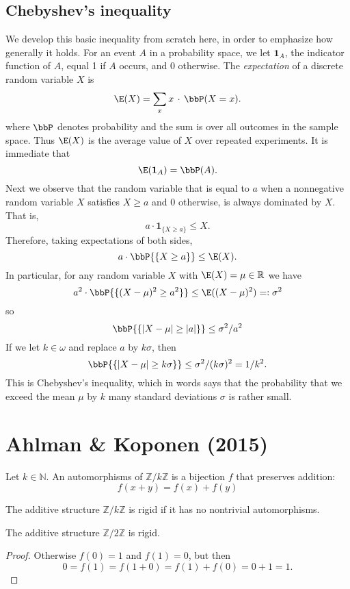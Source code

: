 \section{Chebyshev's inequality}

We develop this basic inequality from scratch here, in order to emphasize how generally it holds. For an event $A$ in a probability space, we let $\mathbf 1_A$, the indicator function of $A$, equal 1 if $A$ occurs, and $0$ otherwise. The \emph{expectation} of a discrete random variable $X$ is 
\[
\E(X)=\sum_x x\,\cdot\,\bbP(X=x).
\]
where $\bbP$ denotes probability and the sum is over all outcomes in the sample space. Thus $\E(X)$ is the average value of $X$ over repeated experiments. It is immediate that
\[
\E (\mathbf 1_{A}) = \bbP(A).
\]
Next we observe that the random variable that is equal to $a$ when a nonnegative random variable $X$ satisfies $X\ge a$ and $0$ otherwise, is always dominated by $X$. That is, 
\[
a\cdot \mathbf 1_{\{X\ge a\}} \le X.
\]
Therefore, taking expectations of both sides,
\[
a\cdot \bbP{\{X\ge a\}} \le \E(X).
\]
In particular, for any random variable $X$ with $\E(X)=\mu\in\mathbb R$ we have 
\[
a^2\cdot \bbP{\{(X-\mu)^2\ge a^2\}} \le \E ((X-\mu)^2)=:\sigma^2
\]
so
\[
\bbP{\{|X-\mu|\ge |a|\}} \le \sigma^2/a^2
\]
If we let $k\in\omega$ and replace $a$ by $k\sigma$, then
\[
\bbP{\{|X-\mu|\ge k\sigma\}} \le \sigma^2/(k\sigma)^2 = 1/k^2.
\]
This is Chebyshev's inequality, which in words says that the probability that we exceed the mean $\mu$ by $k$ many standard deviations $\sigma$ is rather small.

\chapter{Ahlman \& Koponen (2015)}
\begin{definition}
	\label{def:auto}
	\leanok
	Let $k\in\mathbb N$.
	An automorphisms of $\mathbb Z/ k\mathbb Z$ is a bijection $f$ that preserves addition:
	\[
	f(x+y)=f(x)+f(y)
	\]
\end{definition}
\begin{definition}
	\label{def:rigid}
	\leanok
	The additive structure $\mathbb Z/ k\mathbb Z$ is rigid if it has no nontrivial automorphisms.
\end{definition}


\begin{theorem}
	\label{thm:rigid}
	\leanok
	The additive structure $\mathbb Z/ 2\mathbb Z$ is rigid.
\end{theorem}
\begin{proof}
	Otherwise $f(0)=1$ and $f(1)=0$, but then
	\[
	0=f(1)=f(1+0)=f(1)+f(0)=0+1=1.
	\]
\end{proof}


